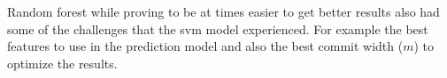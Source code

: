 Random forest while proving to be at times easier to get better results also had some of the challenges that the \gls{svm} model experienced. For example the best features to use in the prediction model and also the best commit width ($m$) to optimize the results.






